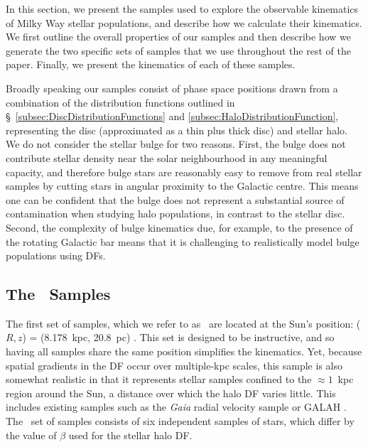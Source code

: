 In this section, we present the samples used to explore the observable kinematics of Milky Way stellar populations, and describe how we calculate their kinematics. We first outline the overall properties of our samples and then describe how we generate the two specific sets of samples that we use throughout the rest of the paper. Finally, we present the kinematics of each of these samples.

Broadly speaking our samples consist of phase space positions drawn from a combination of the distribution functions outlined in \S~\ref{subsec:DiscDistributionFunctions} and \ref{subsec:HaloDistributionFunction}, representing the disc (approximated as a thin plus thick disc) and stellar halo. We do not consider the stellar bulge for two reasons. First, the bulge does not contribute stellar density near the solar neighbourhood in any meaningful capacity, and therefore bulge stars are reasonably easy to remove from real stellar samples by cutting stars in angular proximity to the Galactic centre. This means one can be confident that the bulge does not represent a substantial source of contamination when studying halo populations, in contrast to the stellar disc. Second, the complexity of bulge kinematics due, for example, to the presence of the rotating Galactic bar means that it is challenging to realistically model bulge populations using DFs.

\subsection{The \solar\ Samples}

 The first set of samples, which we refer to as \solar\ are located at the Sun's position: ($R,z$) = (8.178~kpc, 20.8~pc) \parencite{gravity19,bennett19}. This set is designed to be instructive, and so having all samples share the same position simplifies the kinematics. Yet, because spatial gradients in the DF occur over multiple-kpc scales, this sample is also somewhat realistic in that it represents stellar samples confined to the $\approx 1$~kpc region around the Sun, a distance over which the halo DF varies little. This includes existing samples such as the \textit{Gaia} radial velocity sample \parencite[see section~3.3 in  ][ for the most recent data]{gaiaedr3} or GALAH \parencite{galah,galahdr3}. The \solar\ set of samples consists of six independent samples of stars, which differ by the value of $\beta$ used for the stellar halo DF.

